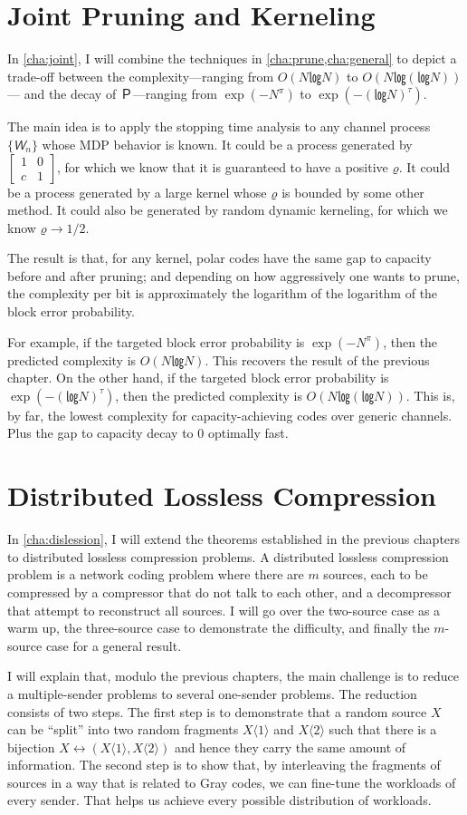 \documentclass[openany]{amsbook}
\numberwithin{equation}{chapter}
\numberwithin{figure}{chapter}
\numberwithin{table}{chapter}
\def\locl{\bsm{1&0\\c&1}}
\def\bsm#1{[\begin{smallmatrix}#1\end{smallmatrix}]}
\theoremstyle{definition}	理dfn:Definition~?s			理exa:Example~?s
\theoremstyle{remark}		理cla:Claim~?s				理rem:Remark~?s
\begin{document}
\section{Joint Pruning and Kerneling}

	In \cref{cha:joint}, I will combine the techniques
	in \cref{cha:prune,cha:general} to depict a trade-off between
	the complexity---ranging from $O(N㏒N)$ to $O(N㏒(㏒N))$---%
	and the decay of $Ｐ$---ranging from $\exp(-N^π)$ to $\exp(-(㏒N)^τ)$.
	
	The main idea is to apply the stopping time analysis to
	any channel process $\{𝘞_n\}$ whose MDP behavior is known.
	It could be a process generated by $\locl$,
	for which we know that it is guaranteed to have a positive $ϱ$.
	It could be a process generated by a large kernel
	whose $ϱ$ is bounded by some other method.
	It could also be generated by random dynamic kerneling, for which we know $ϱ→1/2$.
	
	The result is that, for any kernel, polar codes have
	the same gap to capacity before and after pruning;
	and depending on how aggressively one wants to prune, the complexity per bit
	is approximately the logarithm of the logarithm of the block error probability.
	
	For example, if the targeted block error probability is $\exp(-N^π)$,
	then the predicted complexity is $O(N㏒N)$.
	This recovers the result of the previous chapter.
	On the other hand, if the targeted block error probability is $\exp(-(㏒N)^τ)$,
	then the predicted complexity is $O(N㏒(㏒N))$.
	This is, by far, the lowest complexity for
	capacity-achieving codes over generic channels.
	Plus the gap to capacity decay to $0$ optimally fast.

\section{Distributed Lossless Compression}

	In \cref{cha:dislession}, I will extend the theorems established
	in the previous chapters to distributed lossless compression problems.
	A distributed lossless compression problem
	is a network coding problem where there are $m$ sources,
	each to be compressed by a compressor that do not talk to each other,
	and a decompressor that attempt to reconstruct all sources.
	I will go over the two-source case as a warm up,
	the three-source case to demonstrate the difficulty,
	and finally the $m$-source case for a general result.
	
	I will explain that, modulo the previous chapters,
	the main challenge is to reduce a multiple-sender problems
	to several one-sender problems.
	The reduction consists of two steps.
	The first step is to demonstrate that a random source $X$ can be “split”
	into two random fragments $X⟨1⟩$ and $X⟨2⟩$ such that there is a bijection
	$X↔(X⟨1⟩,X⟨2⟩)$ and hence they carry the same amount of information.
	The second step is to show that, by interleaving the fragments of sources in a way
	that is related to Gray codes, we can fine-tune the workloads of every sender.
	That helps us achieve every possible distribution of workloads.
	
\end{document}
